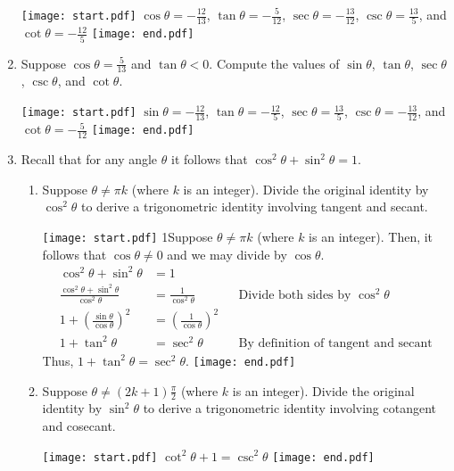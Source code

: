 \documentclass[12pt]{article}
\begin{document}
\begin{enumerate}
\texttt{[image: start.pdf]}
{$\cos{\theta}=-\frac{12}{13}$, $\tan{\theta}=-\frac{5}{12}$, $\sec{\theta}=-\frac{13}{12}$, $\csc{\theta}=\frac{13}{5}$, and $\cot{\theta}=-\frac{12}{5}$}
\texttt{[image: end.pdf]}


\item Suppose $\cos{\theta}=\frac{5}{13}$ and $\tan{\theta}<0$.  Compute the values of $\sin{\theta}$, $\tan{\theta}$, $\sec{\theta}$, $\csc{\theta}$, and $\cot{\theta}$.

\texttt{[image: start.pdf]}
{$\sin{\theta}=-\frac{12}{13}$, $\tan{\theta}=-\frac{12}{5}$, $\sec{\theta}=\frac{13}{5}$, $\csc{\theta}=-\frac{13}{12}$, and $\cot{\theta}=-\frac{5}{12}$}
\texttt{[image: end.pdf]}


\item Recall that for any angle $\theta$ it follows that $\cos^2\theta+\sin^2\theta=1$.  

\begin{enumerate}

\item Suppose $\theta\neq\pi k$ (where $k$ is an integer).  Divide the original identity by $\cos^2\theta$ to derive a trigonometric identity involving tangent and secant.

\texttt{[image: start.pdf]}
{{1\linewidth}{Suppose $\theta\neq\pi k$ (where $k$ is an integer).  Then, it follows that $\cos{\theta}\neq 0$ and we may divide by $\cos{\theta}$.
\begin{align*}
\cos^2\theta+\sin^2\theta&=1\\
\frac{\cos^2\theta+\sin^2\theta}{\cos^2\theta} &=\frac{1}{\cos^2\theta} && \text{Divide both sides by $\cos^2\theta$}\\
1+\left(\frac{\sin\theta}{\cos\theta}\right)^2&=\left(\frac{1}{\cos\theta}\right)^2 && \\
1+\tan^2\theta&=\sec^2\theta && \text{By definition of tangent and secant}
\end{align*}
Thus, $1+\tan^2\theta=\sec^2\theta$.
}}
\texttt{[image: end.pdf]}


\item Suppose $\theta\neq(2k+1)\frac{\pi}{2}$ (where $k$ is an integer).  Divide the original identity by $\sin^2\theta$ to derive a trigonometric identity involving cotangent and cosecant.

\texttt{[image: start.pdf]}
{$\cot^2\theta+1=\csc^2\theta$}
\texttt{[image: end.pdf]}


\end{enumerate}


\end{enumerate}
\end{document}
